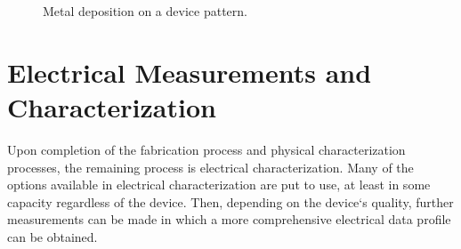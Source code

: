 \begin{figure}[ht]
	\centering
	\qquad
	\caption[/ deposited on device]{Metal deposition on a device pattern.}
	\label{fig:liftoff}
\end{figure}


\section{Electrical Measurements and Characterization}\label{sec:measurements}
Upon completion of the fabrication process and physical characterization processes, the remaining process is electrical characterization. Many of the options available in electrical characterization are put to use, at least in some capacity regardless of the device. Then, depending on the device`s quality, further measurements can be made in which a more comprehensive electrical data profile can be obtained.
